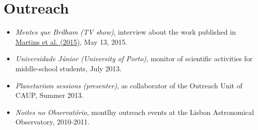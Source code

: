 \documentclass[10pt]{article}
\makeatletter
\renewcommand{\labelenumi}{\@biblabel{A\theenumi}} %
\makeatother
\begin{document}
\fi

\ifoutreach

\section{Outreach}
\begin{itemize}
\item \emph{Mentes que Brilham (TV show)}, interview about the work published in \href{http://adsabs.harvard.edu/cgi-bin/nph-abs_connect?fforward=http://dx.doi.org/10.1051/0004-6361/201425298}{Martins et al. (2015)}, May 13, 2015.
\item \emph{Universidade Júnior (University of Porto)}, monitor of scientific activities for middle-school students, July 2013.
\item \emph{Planetarium sessions (presenter)}, as collaborator of the Outreach Unit of CAUP, Summer 2013.
\item \emph{Noites no Observatório}, montlhy outreach events at the Lisbon Astronomical Observatory, 2010-2011.
\end{itemize}

\fi


\end{document}
